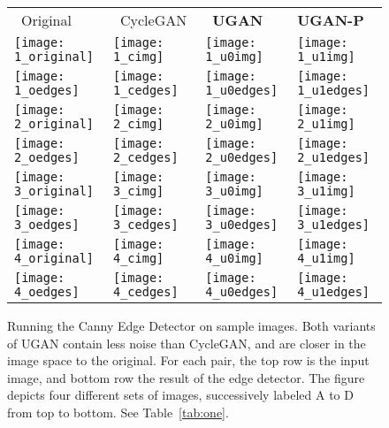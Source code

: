 \begin{figure}[h]
\centering
\begin{tabular}{p{1.7cm} p{1.7cm} p{1.7cm} p{1.75cm}}
  
   ~\quad Original & ~CycleGAN & ~\quad \textbf{UGAN} & \quad \textbf{UGAN-P} \\

   \texttt{[image: 1\_original]} &
   \texttt{[image: 1\_cimg]} &
   \texttt{[image: 1\_u0img]} &
   \texttt{[image: 1\_u1img]} \\ [-1ex]
   \texttt{[image: 1\_oedges]} &
   \texttt{[image: 1\_cedges]} &
   \texttt{[image: 1\_u0edges]} &
   \texttt{[image: 1\_u1edges]} \\

   \texttt{[image: 2\_original]} &
   \texttt{[image: 2\_cimg]} &
   \texttt{[image: 2\_u0img]} &
   \texttt{[image: 2\_u1img]} \\ [-1ex]
   \texttt{[image: 2\_oedges]} &
   \texttt{[image: 2\_cedges]} &
   \texttt{[image: 2\_u0edges]} &
   \texttt{[image: 2\_u1edges]} \\

   \texttt{[image: 3\_original]} &
   \texttt{[image: 3\_cimg]} &
   \texttt{[image: 3\_u0img]} &
   \texttt{[image: 3\_u1img]} \\ [-1ex]
   \texttt{[image: 3\_oedges]} &
   \texttt{[image: 3\_cedges]} &
   \texttt{[image: 3\_u0edges]} &
   \texttt{[image: 3\_u1edges]} \\
   
   \texttt{[image: 4\_original]} &
   \texttt{[image: 4\_cimg]} &
   \texttt{[image: 4\_u0img]} &
   \texttt{[image: 4\_u1img]} \\ [-1ex]
   \texttt{[image: 4\_oedges]} &
   \texttt{[image: 4\_cedges]} &
   \texttt{[image: 4\_u0edges]} &
   \texttt{[image: 4\_u1edges]} \\

\end{tabular}
\caption{Running the Canny Edge Detector on sample images. Both variants of UGAN contain less noise than CycleGAN,
and are closer in the image space to the original. For each pair, the top row is the input image, and bottom row
the result of the edge detector. The figure depicts four different sets of images, successively labeled A to D from top to 
bottom. See Table~\ref{tab:one}.}
\label{fig:canny_samples}
\vspace{-5mm}
\end{figure}

